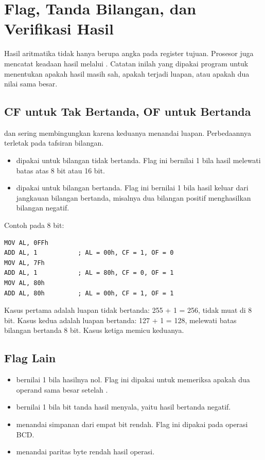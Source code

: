 \section{Flag, Tanda Bilangan, dan Verifikasi Hasil}
\label{sec:flag-verifikasi}

Hasil aritmatika tidak hanya berupa angka pada register tujuan.
Prosesor juga mencatat keadaan hasil melalui . Catatan
inilah yang dipakai program untuk menentukan apakah hasil masih sah,
apakah terjadi luapan, atau apakah dua nilai sama besar.

\subsection{CF untuk Tak Bertanda, OF untuk Bertanda}

 dan  sering membingungkan karena keduanya
menandai luapan. Perbedaannya terletak pada tafsiran bilangan.

\begin{itemize}
    \item {} dipakai untuk bilangan tidak bertanda. Flag ini
          bernilai 1 bila hasil melewati batas atas 8 bit atau 16 bit.
    \item {} dipakai untuk bilangan bertanda. Flag ini
          bernilai 1 bila hasil keluar dari jangkauan bilangan
          bertanda, misalnya dua bilangan positif menghasilkan
          bilangan negatif.
\end{itemize}

Contoh pada 8 bit:

\begin{lstlisting}[language=MASM, numbers=none]
MOV AL, 0FFh
ADD AL, 1           ; AL = 00h, CF = 1, OF = 0
MOV AL, 7Fh
ADD AL, 1           ; AL = 80h, CF = 0, OF = 1
MOV AL, 80h
ADD AL, 80h         ; AL = 00h, CF = 1, OF = 1
\end{lstlisting}

Kasus pertama adalah luapan tidak bertanda: 255 + 1 = 256, tidak muat
di 8 bit. Kasus kedua adalah luapan bertanda: 127 + 1 = 128, melewati
batas bilangan bertanda 8 bit. Kasus ketiga memicu keduanya.

\subsection{Flag Lain}

\begin{itemize}
    \item {} bernilai 1 bila hasilnya nol. Flag ini dipakai
          untuk memeriksa apakah dua operand sama besar setelah
          .
    \item {} bernilai 1 bila bit tanda hasil menyala, yaitu
          hasil bertanda negatif.
    \item {} menandai simpanan dari empat bit rendah. Flag ini
          dipakai pada operasi BCD.
    \item {} menandai paritas byte rendah hasil operasi.
\end{itemize}

